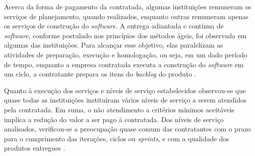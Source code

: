 Acerca da forma de pagamento da contratada, algumas instituições remuneram os serviços de planejamento, quando realizados, enquanto outras remuneram apenas os serviços de construção do \textit{software}. A entrega adiantada e contínua de \textit{software}, conforme postulado nos princípios dos métodos ágeis, foi observada em algumas das instituições. Para alcançar esse objetivo, elas paralelizam as atividades de preparação, execução e homologação, ou seja, em um dado período de tempo, enquanto a empresa contratada executa a construção do \textit{software} em um ciclo, a contratante prepara os itens do \textit{backlog} do produto \cite{TCU:2013}. 

Quanto à execução dos serviços e níveis de serviço estabelecidos observou-se que quase todas as instituições instituíram vários níveis de serviço a serem atendidos pela contratada. Em suma, o não atendimento a critérios mínimos aceitáveis implica a redução do valor a ser pago à contratada. Dos níveis de serviço analisados, verificou-se a preocupação quase comum das contratantes com o prazo para o cumprimento das iterações, ciclos ou \textit{sprints}, e com a qualidade dos produtos entregues  \cite{TCU:2013}.

